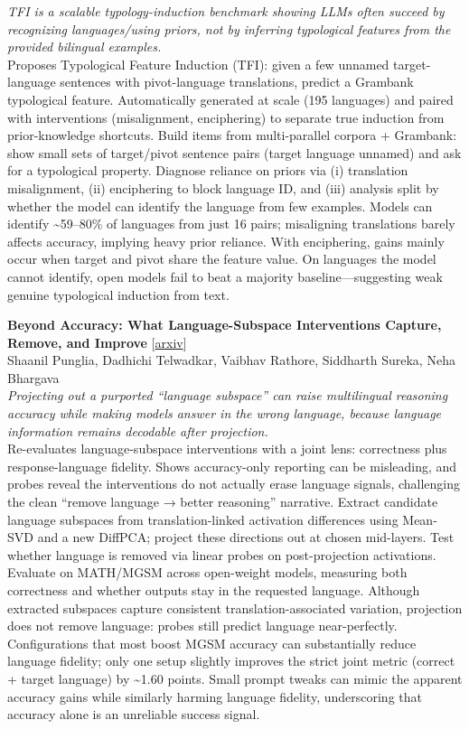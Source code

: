 \documentclass[12pt,letterpaper]{article}
\begin{document}
{\small\textit{TFI is a scalable typology-induction benchmark showing LLMs often succeed by recognizing languages/using priors, not by inferring typological features from the provided bilingual examples.}}\\[1pt]
{\footnotesize Proposes Typological Feature Induction (TFI): given a few unnamed target-language sentences with pivot-language translations, predict a Grambank typological feature. Automatically generated at scale (195 languages) and paired with interventions (misalignment, enciphering) to separate true induction from prior-knowledge shortcuts. Build items from multi-parallel corpora + Grambank: show small sets of target/pivot sentence pairs (target language unnamed) and ask for a typological property. Diagnose reliance on priors via (i) translation misalignment, (ii) enciphering to block language ID, and (iii) analysis split by whether the model can identify the language from few examples. Models can identify \textasciitilde{}59--80\% of languages from just 16 pairs; misaligning translations barely affects accuracy, implying heavy prior reliance. With enciphering, gains mainly occur when target and pivot share the feature value. On languages the model cannot identify, open models fail to beat a majority baseline---suggesting weak genuine typological induction from text.}

\medskip

{\small\textbf{Beyond Accuracy: What Language-Subspace Interventions Capture, Remove, and Improve}} {\scriptsize[\href{https://arxiv.org/abs/2611.05278}{arxiv}]}\\
{\scriptsize Shaanil Punglia, Dadhichi Telwadkar, Vaibhav Rathore, Siddharth Sureka, Neha Bhargava}\\

{\small\textit{Projecting out a purported ``language subspace'' can raise multilingual reasoning accuracy while making models answer in the wrong language, because language information remains decodable after projection.}}\\[1pt]
{\footnotesize Re-evaluates language-subspace interventions with a joint lens: correctness plus response-language fidelity. Shows accuracy-only reporting can be misleading, and probes reveal the interventions do not actually erase language signals, challenging the clean ``remove language → better reasoning'' narrative. Extract candidate language subspaces from translation-linked activation differences using Mean-SVD and a new DiffPCA; project these directions out at chosen mid-layers. Test whether language is removed via linear probes on post-projection activations. Evaluate on MATH/MGSM across open-weight models, measuring both correctness and whether outputs stay in the requested language. Although extracted subspaces capture consistent translation-associated variation, projection does not remove language: probes still predict language near-perfectly. Configurations that most boost MGSM accuracy can substantially reduce language fidelity; only one setup slightly improves the strict joint metric (correct + target language) by \textasciitilde{}1.60 points. Small prompt tweaks can mimic the apparent accuracy gains while similarly harming language fidelity, underscoring that accuracy alone is an unreliable success signal.}
\end{document}
